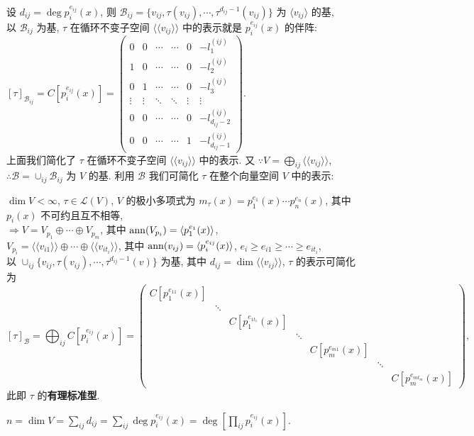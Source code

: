 \documentclass{note}
\begin{document}
设 $d_{ij}=\deg p_i^{e_{ij}}(x)$, 则 $\mathcal{B}_{ij}=\{v_{ij},\tau(v_{ij}),\cdots,\tau^{d_{ij}-1}(v_{ij})\}$ 为 $\langle v_{ij}\rangle$ 的基,\\
以 $\mathcal{B}_{ij}$ 为基, $\tau$ 在循环不变子空间 $\langle\langle v_{ij}\rangle\rangle$ 中的表示就是 $p_i^{e_{ij}}(x)$ 的伴阵: $[\tau]_{\mathcal{B}_{ij}}=C[p_i^{e_{ij}}(x)]=\begin{pmatrix}
    0&0&\cdots&\cdots&0&-l_1^{(ij)}\\
    1&0&\cdots&\cdots&0&-l_2^{(ij)}\\
    0&1&\cdots&\cdots&0&-l_3^{(ij)}\\
    \vdots&\vdots&\ddots&\ddots&\vdots&\vdots\\
    0&0&\cdots&\cdots&0&-l_{d_{ij}-2}^{(ij)}\\
    0&0&\cdots&\cdots&1&-l_{d_{ij}-1}^{(ij)}
\end{pmatrix}$.\\

上面我们简化了 $\tau$ 在循环不变子空间 $\langle\langle v_{ij}\rangle\rangle$ 中的表示. 又 $\because V=\bigoplus_{ij}\langle\langle v_{ij}\rangle\rangle$, $\therefore\mathcal{B}=\cup_{ij}\mathcal{B}_{ij}$ 为 $V$ 的基. 利用 $\mathcal{B}$ 我们可简化 $\tau$ 在整个向量空间 $V$ 中的表示:
\begin{thm}[(课本定理 7.10)]\label{thm-7.10}
    $\dim V<\infty$, $\tau\in\mathcal{L}(V)$, $V$ 的极小多项式为 $m_{\tau}(x)=p_1^{e_1}(x)\cdots p_n^{e_n}(x)$, 其中 $p_i(x)$ 不可约且互不相等,\\
    $\Longrightarrow V=V_{p_1}\oplus\cdots\oplus V_{p_m}$, 其中 $\operatorname{ann}(V_{p_i})=\langle p_1^{e_1}(x)\rangle$,\\
    $V_{p_i}=\langle\langle v_{i1}\rangle\rangle\oplus\cdots\oplus\langle\langle v_{it_i}\rangle\rangle$, 其中 $\operatorname{ann}(v_{ij})=\langle p_i^{e_{ij}}(x)\rangle$, $e_i\geq e_{i1}\geq\cdots\geq e_{it_i}$,\\
    以 $\cup_{ij}\{v_{ij},\tau(v_{ij}),\cdots,\tau^{d_{ij}-1}(v)\}$ 为基, 其中 $d_{ij}=\dim\langle\langle v_{ij}\rangle\rangle$, $\tau$ 的表示可简化为
    $$[\tau]_{\mathcal{B}}=\bigoplus_{ij}C[p_i^{e_{ij}}(x)]=\begin{pmatrix}
        C[p_1^{e_{11}}(x)]\\
        &\ddots\\
        &&C[p_1^{e_{1t_1}}(x)]\\
        &&&\ddots\\
        &&&&C[p_m^{e_{m1}}(x)]\\
        &&&&&\ddots\\
        &&&&&&C[p_m^{e_{mt_m}}(x)]
    \end{pmatrix},$$
    此即 $\tau$ 的\textbf{有理标准型}.
\end{thm}

$n=\dim V=\sum_{ij}d_{ij}=\sum_{ij}\deg p_i^{e_{ij}}(x)=\deg\left[\prod_{ij}p_i^{e_{ij}}(x)\right]$.
\ifx\allfiles\undefined
\end{document}

